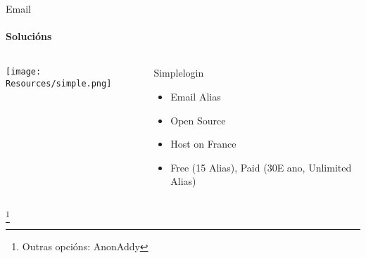 \documentclass{beamer}
\begin{document}
\begin{frame}{Email}
  \framesubtitle{Solucións}

  \begin{columns}
    \begin{column}{0.5\textwidth}
      \texttt{[image: Resources/simple.png]}

      \vspace{1cm}


    \end{column}

    \begin{column}{0.5\textwidth}
      \begin{block}{Simplelogin}
        \begin{itemize}
          \item Email Alias
          \item Open Source
          \item Host on France
          \item Free (15 Alias), Paid (30E ano, Unlimited Alias)
        \end{itemize}
      \end{block}

    \end{column}

  \end{columns}

  \footnote{Outras opcións: AnonAddy}

\end{frame}


\end{document}
